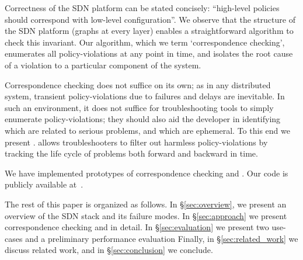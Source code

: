 Correctness of the SDN platform can be stated concisely: ``high-level policies
should correspond with low-level configuration''. We observe that the structure
of the SDN platform (graphs at every layer) enables a straightforward
algorithm to check this invariant. Our algorithm, which we term
`correspondence checking',
enumerates all policy-violations at any point in time, and isolates the
root cause of a violation to a particular component of the system.

Correspondence checking does not suffice on its own; as in any distributed
system, transient policy-violations due to failures and delays are inevitable.
In such an environment, it does not suffice for troubleshooting tools to
simply enumerate policy-violations; they should also aid the developer
in identifying which are related to serious problems, and which are
ephemeral. To this end we present \simulator{}.
\Simulator{} allows troubleshooters 
to filter out harmless policy-violations by tracking the life cycle of problems 
both forward and backward in time.

We have implemented prototypes
of correspondence checking and \simulator{}. Our code is publicly available
at~\cite{github}.

The rest of this paper is organized as follows. In \S\ref{sec:overview},
we present an overview of the SDN stack and its failure modes.
In \S\ref{sec:approach} we present correspondence checking and
\simulator{} in detail. In \S\ref{sec:evaluation} we present
two use-cases and a preliminary performance evaluation
Finally, in \S\ref{sec:related_work} we discuss related work,
and in \S\ref{sec:conclusion} we conclude.
